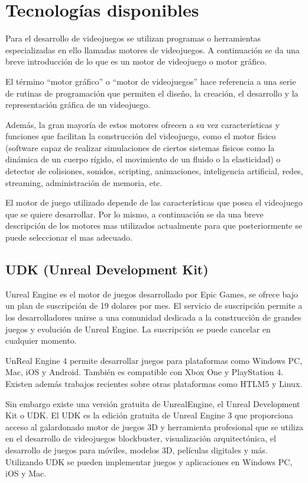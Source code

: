 \section{Tecnologías disponibles}

Para el desarrollo de videojuegos se utilizan programas o herramientas especializadas en ello llamadas motores de videojuegos. A continuación se da una breve introducción de lo que es un motor de videojuego o motor gráfico.

El término “motor gráfico” o “motor de videojuegos” hace referencia a una serie de rutinas de programación que permiten el diseño, la creación, el desarrollo y la representación gráfica de un videojuego\cite{videojuego:telechea}.

Además, la gran mayoría de estos motores ofrecen a su vez características y funciones que facilitan la construcción del videojuego, como el motor físico (software capaz de realizar simulaciones de ciertos sistemas físicos como la dinámica de un cuerpo rígido, el movimiento de un fluido o la elasticidad) o detector de colisiones, sonidos, scripting, animaciones, inteligencia artificial, redes, streaming, administración de memoria, etc\cite{videojuego:telechea}.

El motor de juego utilizado depende de las características que posea el videojuego que se quiere desarrollar. Por lo mismo, a continuación se da una breve descripción de los motores mas utilizados actualmente para que posteriormente se puede seleccionar el mas adecuado.

\subsection{UDK (Unreal Development Kit)}

Unreal Engine\cite{unrealengine} es el motor de juegos desarrollado por Epic Games, se ofrece bajo un plan de suscripción de 19 dolares por mes. El servicio de suscripción permite a los desarrolladores unirse a una comunidad dedicada a la construcción de grandes juegos y evolución de Unreal Engine. La suscripción se puede cancelar en cualquier momento.

UnReal Engine 4 permite desarrollar juegos para plataformas como Windows PC, Mac, iOS y Android. También es compatible con Xbox One y PlayStation 4. Existen además trabajos recientes sobre otras plataformas como HTLM5 y Linux.

Sin embargo existe una versión gratuita de UnrealEngine, el Unreal Development Kit o UDK. El UDK es la edición gratuita de Unreal Engine 3 que proporciona acceso al galardonado motor de juegos 3D y herramienta profesional que se utiliza en el desarrollo de videojuegos blockbuster, visualización arquitectónica, el desarrollo de juegos para móviles, modelos 3D, películas digitales y más. Utilizando UDK se pueden implementar juegos y aplicaciones en Windows PC, iOS y Mac.



